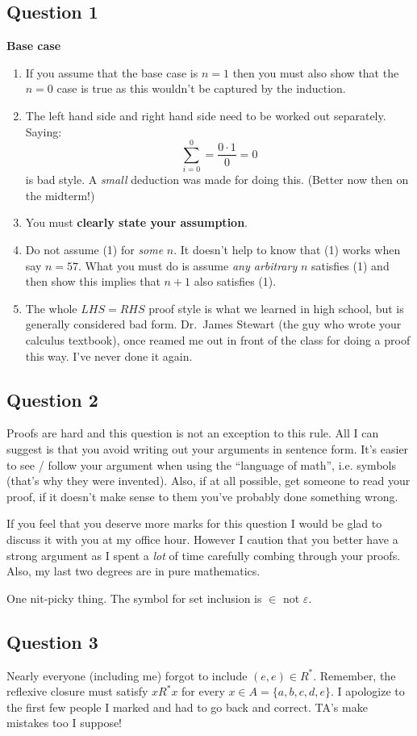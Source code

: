 \documentclass[12pt]{article}
\begin{document}
\subsection*{Question 1}
\textbf{Base case}
\begin{enumerate}
\item If you assume that the base case is $n=1$ then you must also show that the $n=0$ case is true as this wouldn't be captured by the induction. 
\item The left hand side and right hand side need to be worked out separately. Saying:
$$\sum_{i=0}^0 = \frac{0\cdot1}{0} = 0$$ is bad style. A \emph{small} deduction was made for doing this. (Better now then on the midterm!)
\item You must \textbf{clearly state your assumption}.
\item Do not assume (1) for \emph{some} $n$. It doesn't help to know that (1) works when say $n=57$. What you must do is assume \emph{any arbitrary} $n$ satisfies (1) and then show this implies that $n+1$ also satisfies (1). 
\item The whole $LHS = RHS$ proof style is what we learned in high school, but is generally considered bad form. Dr.\ James Stewart (the guy who wrote your calculus textbook), once reamed me out in front of the class for doing a proof this way. I've never done it again.
\end{enumerate}

\subsection*{Question 2}
Proofs are hard and this question is not an exception to this rule. All I can suggest is that you avoid writing out your arguments in sentence form. It's easier to see / follow your argument when using the ``language of math'', i.e. symbols (that's why they were invented). Also, if at all possible, get someone to read your proof, if it doesn't make sense to them you've probably done something wrong.

If you feel that you deserve more marks for this question I would be glad to discuss it with you at my office hour. However I caution that you better have a strong argument as I spent a \emph{lot} of time carefully combing through your proofs. Also, my last two degrees are in pure mathematics.

One nit-picky thing. The symbol for set inclusion is $\in$ not $\varepsilon$.

\subsection*{Question 3}
Nearly everyone (including me) forgot to include $(e,e) \in R^*$. Remember, the reflexive closure must satisfy $xR^*x$ for every $x \in A = \{a,b,c,d,e \}$. I apologize to the first few people I marked and had to go back and correct. TA's make mistakes too I suppose!
\end{document}
